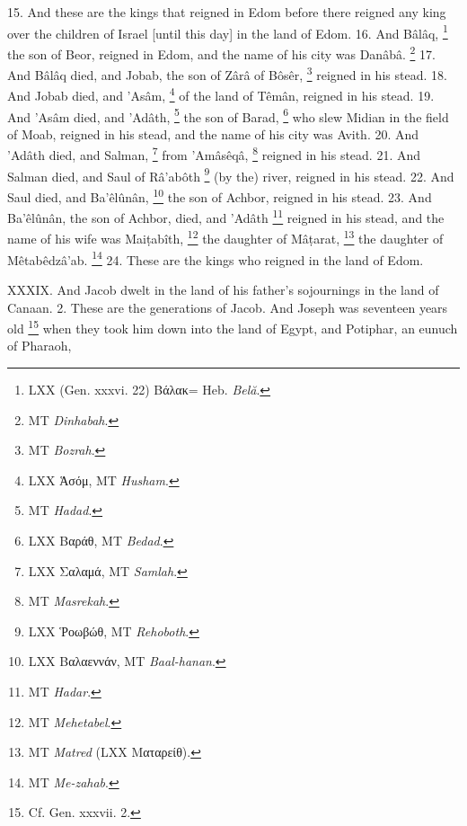 
15. And these are the kings that reigned in Edom before there reigned any king over the children of Israel [until this day] in the land of Edom. 16. And Bâlâq, \footnote{LXX (Gen. xxxvi. 22) \textgreek{Βάλακ}= Heb. \emph{Belă}.} the son of Beor, reigned in Edom, and the name of his city was Danâbâ. \footnote{MT \emph{Dinhabah}.} 17. And Bâlâq died, and Jobab, the son of Zârâ of Bôsêr, \footnote{MT \emph{Bozrah}.} reigned in his stead. 18. And Jobab died, and ’Asâm, \footnote{LXX \textgreek{Ἁσόμ}, MT \emph{Husham}.} of the land of Têmân, reigned in his stead. 19. And ’Asâm died, and ’Adâth, \footnote{MT \emph{Hadad}.} the son of Barad, \footnote{LXX \textgreek{Βαράθ}, MT \emph{Bedad}.} who slew Midian in the field of Moab, reigned in his stead, and the name of his city was Avith. 20. And ’Adâth died, and Salman, \footnote{LXX \textgreek{Σαλαμά}, MT \emph{Samlah}.} from ’Amâsêqâ, \footnote{MT \emph{Masrekah}.} reigned in his stead. 21. And Salman died, and Saul of Râ’abôth \footnote{LXX \textgreek{Ῥοωβώθ}, MT \emph{Rehoboth}.} (by the) river, reigned in his stead. 22. And Saul died, and Ba’êlûnân, \footnote{LXX \textgreek{Βαλαεννάν}, MT \emph{Baal-hanan}.} the son of Achbor, reigned in his stead. 23. And Ba’êlûnân, the son of Achbor, died, and ’Adâth \footnote{MT \emph{Hadar}.} reigned in his stead, and the name of his wife was Mai\d{t}abîth, \footnote{MT \emph{Mehetabel}.} the daughter of Mâ\d{t}arat, \footnote{MT \emph{Matred} (LXX \textgreek{Ματαρείθ}).} the daughter of Mêtabêdzâ’ab. \footnote{MT \emph{Me-zahab}.} 24. These are the kings who reigned in the land of Edom.


XXXIX. And Jacob dwelt in the land of his father's sojournings in the land of Canaan. 2. These are the generations of Jacob. And Joseph was seventeen years old \footnote{Cf. Gen. xxxvii. 2.} when they took him down into the land of Egypt, and Potiphar, an eunuch of Pharaoh,

